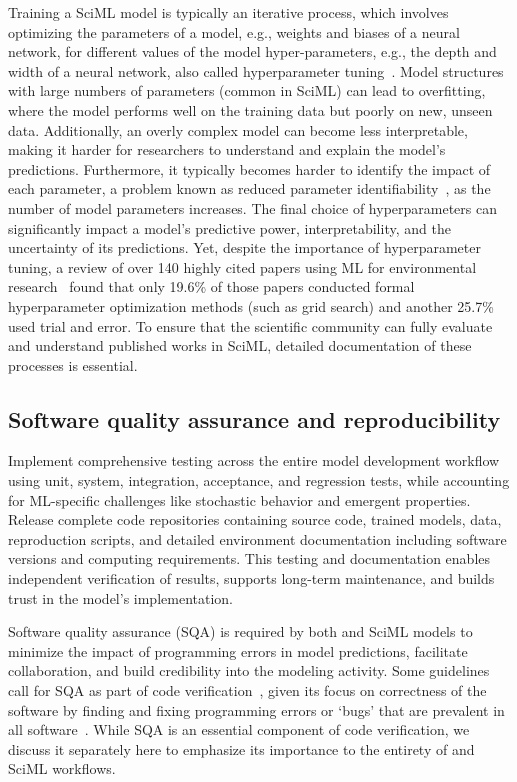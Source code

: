 Training a SciML model is typically an iterative process, which involves optimizing the parameters of a model, e.g., weights and biases of a neural network, for different values of the model hyper-parameters, e.g., the depth and width of a neural network, also called hyperparameter tuning~\cite{Feurer_H_AMLMSC_2019}. 
Model structures with large numbers of parameters (common in SciML) can lead to overfitting, where the model performs well on the training data but poorly on new, unseen data. Additionally, an overly complex model can become less interpretable, making it harder for researchers to understand and explain the model's predictions. Furthermore, it typically becomes harder to identify the impact of each parameter, a problem known as reduced parameter identifiability~\cite{Guillaume_Jetal_EMS_2019}, as the number of model parameters increases. 
The final choice of hyperparameters can significantly impact a model's predictive power, interpretability, and the uncertainty of its predictions. Yet, despite the importance of hyperparameter tuning, a review of over 140 highly cited papers using ML for environmental research~\cite{Zhu_YR_EST_2023} found that only 19.6\% of those papers conducted formal hyperparameter optimization methods (such as grid search) and another 25.7\% used trial and error. To ensure that the scientific community can fully evaluate and understand published works in SciML, detailed documentation of these processes is essential. 

\subsection{Software quality assurance and reproducibility}

\begin{essrec}
Implement comprehensive testing across the entire model development workflow using unit, system, integration, acceptance, and regression tests, while accounting for ML-specific challenges like stochastic behavior and emergent properties. Release complete code repositories containing source code, trained models, data, reproduction scripts, and detailed environment documentation including software versions and computing requirements. This testing and documentation enables independent verification of results, supports long-term maintenance, and builds trust in the model's implementation.
\end{essrec}

Software quality assurance (SQA) is required by both \CSE{} and SciML models to minimize the impact of programming errors in model predictions, facilitate collaboration, and build credibility into the modeling activity. Some \CSE{} guidelines call for SQA as part of code verification~\cite{Oberkampf_T_PAS_2002}, given its focus on correctness of the software by finding and fixing programming errors or `bugs' that are prevalent in all software~\cite{Hatton_book_1997, Zhang_IEEECSS_2009}. 
While SQA is an essential component of code verification, we discuss it separately here to emphasize its importance to the entirety of \CSE{} and SciML workflows. 

